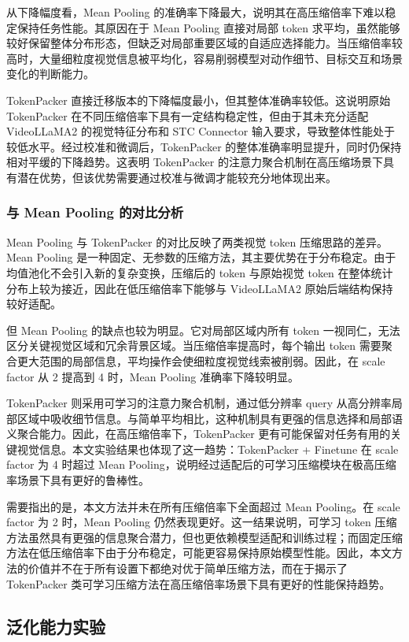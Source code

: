 从下降幅度看，Mean Pooling 的准确率下降最大，说明其在高压缩倍率下难以稳定保持任务性能。其原因在于 Mean Pooling 直接对局部 token 求平均，虽然能够较好保留整体分布形态，但缺乏对局部重要区域的自适应选择能力。当压缩倍率较高时，大量细粒度视觉信息被平均化，容易削弱模型对动作细节、目标交互和场景变化的判断能力。

TokenPacker 直接迁移版本的下降幅度最小，但其整体准确率较低。这说明原始 TokenPacker 在不同压缩倍率下具有一定结构稳定性，但由于其未充分适配 VideoLLaMA2 的视觉特征分布和 STC Connector 输入要求，导致整体性能处于较低水平。经过校准和微调后，TokenPacker 的整体准确率明显提升，同时仍保持相对平缓的下降趋势。这表明 TokenPacker 的注意力聚合机制在高压缩场景下具有潜在优势，但该优势需要通过校准与微调才能较充分地体现出来。

\subsubsection{与 Mean Pooling 的对比分析}

Mean Pooling 与 TokenPacker 的对比反映了两类视觉 token 压缩思路的差异。Mean Pooling 是一种固定、无参数的压缩方法，其主要优势在于分布稳定。由于均值池化不会引入新的复杂变换，压缩后的 token 与原始视觉 token 在整体统计分布上较为接近，因此在低压缩倍率下能够与 VideoLLaMA2 原始后端结构保持较好适配。

但 Mean Pooling 的缺点也较为明显。它对局部区域内所有 token 一视同仁，无法区分关键视觉区域和冗余背景区域。当压缩倍率提高时，每个输出 token 需要聚合更大范围的局部信息，平均操作会使细粒度视觉线索被削弱。因此，在 scale factor 从 2 提高到 4 时，Mean Pooling 准确率下降较明显。

TokenPacker 则采用可学习的注意力聚合机制，通过低分辨率 query 从高分辨率局部区域中吸收细节信息。与简单平均相比，这种机制具有更强的信息选择和局部语义聚合能力。因此，在高压缩倍率下，TokenPacker 更有可能保留对任务有用的关键视觉信息。本文实验结果也体现了这一趋势：TokenPacker + Finetune 在 scale factor 为 4 时超过 Mean Pooling，说明经过适配后的可学习压缩模块在极高压缩率场景下具有更好的鲁棒性。

需要指出的是，本文方法并未在所有压缩倍率下全面超过 Mean Pooling。在 scale factor 为 2 时，Mean Pooling 仍然表现更好。这一结果说明，可学习 token 压缩方法虽然具有更强的信息聚合潜力，但也更依赖模型适配和训练过程；而固定压缩方法在低压缩倍率下由于分布稳定，可能更容易保持原始模型性能。因此，本文方法的价值并不在于所有设置下都绝对优于简单压缩方法，而在于揭示了 TokenPacker 类可学习压缩方法在高压缩倍率场景下具有更好的性能保持趋势。

\subsection{泛化能力实验}

